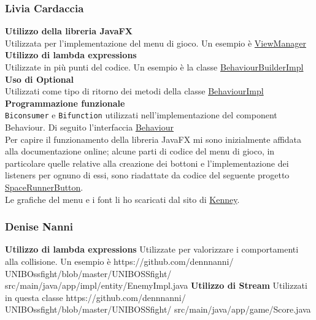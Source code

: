 \documentclass{article}
\begin{document}
\subsubsection{Livia Cardaccia}
\textbf{Utilizzo della libreria JavaFX}\\
Utilizzata per l'implementazione del menu di gioco. Un esempio è \href{https://github.com/dennnanni/UNIBOssfight/blob/61e1d141f734d2205d4e8b65fed0ebfc668a8357/UNIBOSSfight/src/main/java/app/ui/ViewManager.java#L31}{ViewManager}\\
\textbf{Utilizzo di lambda expressions}\\
Utilizzate in più punti del codice. Un esempio è la classe \href{https://github.com/dennnanni/UNIBOssfight/blob/61e1d141f734d2205d4e8b65fed0ebfc668a8357/UNIBOSSfight/src/main/java/app/impl/builder/BehaviourBuilderImpl.java#L13}{BehaviourBuilderImpl}\\
\textbf{Uso di Optional}\\
Utilizzati come tipo di ritorno dei metodi della classe
\href{https://github.com/dennnanni/UNIBOssfight/blob/61e1d141f734d2205d4e8b65fed0ebfc668a8357/UNIBOSSfight/src/main/java/app/impl/component/BehaviourImpl.java#L29}{BehaviourImpl}\\
\textbf{Programmazione funzionale}\\
\texttt{Biconsumer} e \texttt{Bifunction} utilizzati nell'implementazione del component Behaviour. Di seguito l'interfaccia \href{https://github.com/dennnanni/UNIBOssfight/blob/61e1d141f734d2205d4e8b65fed0ebfc668a8357/UNIBOSSfight/src/main/java/app/core/component/Behaviour.java#L14}{Behaviour}\\
\newline
Per capire il funzionamento della libreria JavaFX mi sono inizialmente affidata alla documentazione online; alcune parti di codice del menu di gioco, in particolare quelle relative alla creazione dei bottoni e l'implementazione dei listeners per ognuno di essi, sono riadattate da codice del seguente progetto \href{https://github.com/smowgli/space-runner-game-javafx/blob/dcbb51c278680951043d41d520e1a093f55701dc/src/model/SpaceRunnerButton.java#L11}{SpaceRunnerButton}.\\
Le grafiche del menu e i font li ho scaricati dal sito di \href{https://kenney.nl/}{Kenney}.\\
\subsubsection{Denise Nanni}
\textbf{Utilizzo di lambda expressions}
\newline
Utilizzate per valorizzare i comportamenti alla collisione. Un esempio è https://github.com/dennnanni/
UNIBOssfight/blob/master/UNIBOSSfight/
src/main/java/app/impl/entity/EnemyImpl.java
\newline
\textbf{Utilizzo di Stream}
\newline
Utilizzati in questa classe https://github.com/dennnanni/
UNIBOssfight/blob/master/UNIBOSSfight/
src/main/java/app/game/Score.java
\end{document}
